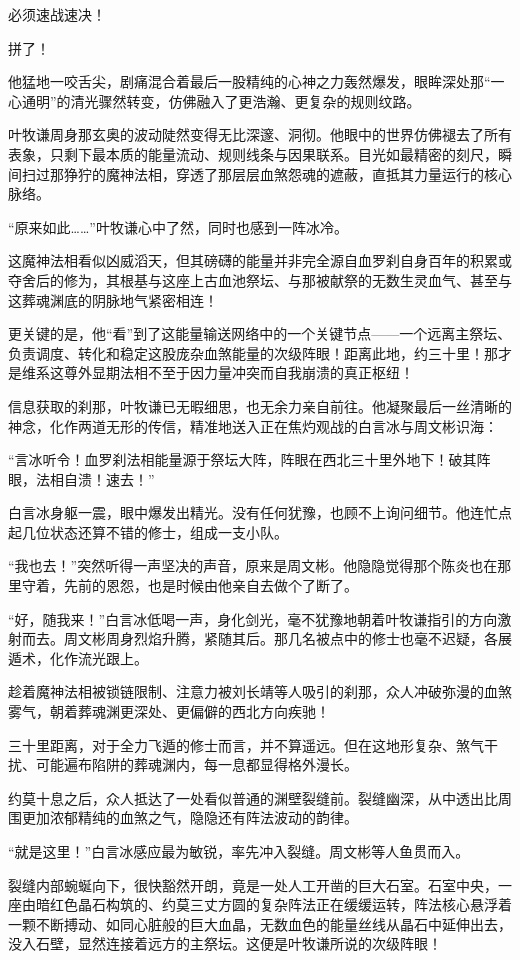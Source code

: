 必须速战速决！

拼了！

他猛地一咬舌尖，剧痛混合着最后一股精纯的心神之力轰然爆发，眼眸深处那“一心通明”的清光骤然转变，仿佛融入了更浩瀚、更复杂的规则纹路。

叶牧谦周身那玄奥的波动陡然变得无比深邃、洞彻。他眼中的世界仿佛褪去了所有表象，只剩下最本质的能量流动、规则线条与因果联系。目光如最精密的刻尺，瞬间扫过那狰狞的魔神法相，穿透了那层层血煞怨魂的遮蔽，直抵其力量运行的核心脉络。

“原来如此……”叶牧谦心中了然，同时也感到一阵冰冷。

这魔神法相看似凶威滔天，但其磅礴的能量并非完全源自血罗刹自身百年的积累或夺舍后的修为，其根基与这座上古血池祭坛、与那被献祭的无数生灵血气、甚至与这葬魂渊底的阴脉地气紧密相连！

更关键的是，他“看”到了这能量输送网络中的一个关键节点——一个远离主祭坛、负责调度、转化和稳定这股庞杂血煞能量的次级阵眼！距离此地，约三十里！那才是维系这尊外显期法相不至于因力量冲突而自我崩溃的真正枢纽！

信息获取的刹那，叶牧谦已无暇细思，也无余力亲自前往。他凝聚最后一丝清晰的神念，化作两道无形的传信，精准地送入正在焦灼观战的白言冰与周文彬识海：

“言冰听令！血罗刹法相能量源于祭坛大阵，阵眼在西北三十里外地下！破其阵眼，法相自溃！速去！”

白言冰身躯一震，眼中爆发出精光。没有任何犹豫，也顾不上询问细节。他连忙点起几位状态还算不错的修士，组成一支小队。

“我也去！”突然听得一声坚决的声音，原来是周文彬。他隐隐觉得那个陈炎也在那里守着，先前的恩怨，也是时候由他亲自去做个了断了。

“好，随我来！”白言冰低喝一声，身化剑光，毫不犹豫地朝着叶牧谦指引的方向激射而去。周文彬周身烈焰升腾，紧随其后。那几名被点中的修士也毫不迟疑，各展遁术，化作流光跟上。

趁着魔神法相被锁链限制、注意力被刘长靖等人吸引的刹那，众人冲破弥漫的血煞雾气，朝着葬魂渊更深处、更偏僻的西北方向疾驰！

三十里距离，对于全力飞遁的修士而言，并不算遥远。但在这地形复杂、煞气干扰、可能遍布陷阱的葬魂渊内，每一息都显得格外漫长。

约莫十息之后，众人抵达了一处看似普通的渊壁裂缝前。裂缝幽深，从中透出比周围更加浓郁精纯的血煞之气，隐隐还有阵法波动的韵律。

“就是这里！”白言冰感应最为敏锐，率先冲入裂缝。周文彬等人鱼贯而入。

裂缝内部蜿蜒向下，很快豁然开朗，竟是一处人工开凿的巨大石室。石室中央，一座由暗红色晶石构筑的、约莫三丈方圆的复杂阵法正在缓缓运转，阵法核心悬浮着一颗不断搏动、如同心脏般的巨大血晶，无数血色的能量丝线从晶石中延伸出去，没入石壁，显然连接着远方的主祭坛。这便是叶牧谦所说的次级阵眼！

